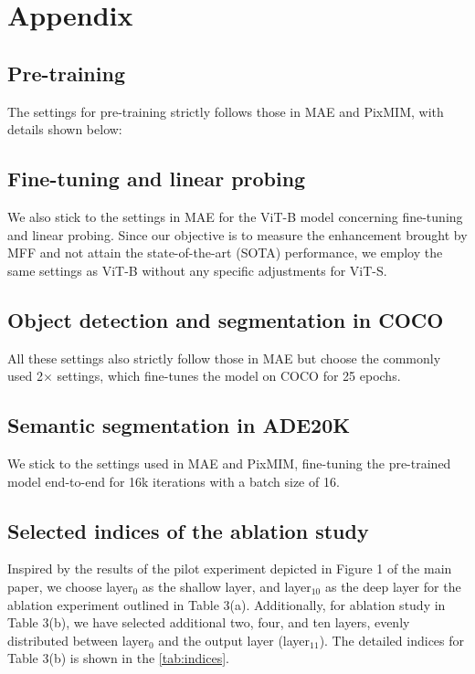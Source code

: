 \appendix

\section{Appendix}

\subsection{Pre-training}

The settings for pre-training strictly follows those in MAE\cite{MAE} and PixMIM\cite{pixmim}, with details shown below:


\subsection{Fine-tuning and linear probing}
We also stick to the settings in MAE\cite{MAE} for the ViT-B\cite{ViT} model concerning fine-tuning and linear probing. Since our objective is to measure the enhancement brought by MFF and not attain the state-of-the-art (SOTA) performance, we employ the same settings as ViT-B without any specific adjustments for ViT-S.




\subsection{Object detection and segmentation in COCO}
All these settings also strictly follow those in MAE\cite{MAE} but choose the commonly used 2$\times$ settings, which fine-tunes the model on COCO\cite{coco} for 25 epochs.

\subsection{Semantic segmentation in ADE20K}
We stick to the settings used in MAE\cite{MAE} and PixMIM\cite{pixmim}, fine-tuning the pre-trained model end-to-end for 16k iterations with a batch size of 16.

\subsection{Selected indices of the ablation study}
Inspired by the results of the pilot experiment depicted in Figure 1 of the main paper, we choose layer$_0$ as the shallow layer, and layer$_{10}$ as the deep layer for the ablation experiment outlined in Table 3(a). Additionally, for ablation study in Table 3(b), we have selected additional two, four, and ten layers, evenly distributed between layer$_0$ and the output layer (layer$_{11}$). The detailed indices for Table 3(b) is shown in the \autoref{tab:indices}. 

